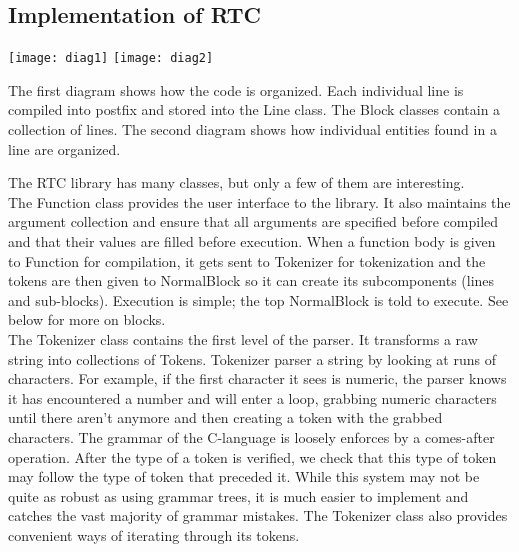 \documentclass{article}
\begin{document}
\subsection{Implementation of RTC}

\begin{center}
\texttt{[image: diag1]}
\texttt{[image: diag2]}
\end{center}

\noindent
The first diagram shows how the code is organized. Each individual line is
compiled into postfix and stored into the Line class. The Block classes
contain a collection of lines. The second diagram shows how individual
entities found in a line are organized.

\noindent
The RTC library has many classes, but only a few of them are interesting.\\

\noindent
The Function class provides the user interface to the library. It also
maintains the argument collection and ensure that all arguments are specified
before compiled and that their values are filled before execution. When a
function body is given to Function for compilation, it gets sent to
Tokenizer for tokenization and the tokens are then given to NormalBlock so
it can create its subcomponents (lines and sub-blocks). Execution is simple;
the top NormalBlock is told to execute. See below for more on blocks.\\

\noindent
The Tokenizer class contains the first level of the parser. It transforms
a raw string into collections of Tokens. Tokenizer parser a string by looking
at runs of characters. For example, if the first character it sees is numeric,
the parser knows it has encountered a number and will enter a loop, grabbing
numeric characters until there aren't anymore and then creating a token with
the grabbed characters. The grammar of the C-language is loosely enforces by
a comes-after operation. After the type of a token is verified, we check that
this type of token may follow the type of token that preceded it. While this
system may not be quite as robust as using grammar trees, it is much easier
to implement and catches the vast majority of grammar mistakes. The Tokenizer
class also provides convenient ways of iterating through its tokens. \\
\end{document}
